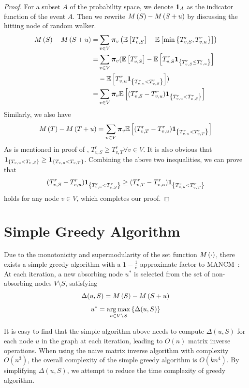 \documentclass[sigconf]{acmart}
\begin{document}
\begin{proof}
    For a subset \(A\) of the probability space, we denote \(\boldsymbol{1}_A\) as the indicator function of the event \(A\). Then we rewrite \(M\left(S\right)-M\left(S+u\right)\) by discussing the hitting node of random walker.
    \begin{align*}
        M\left(S\right)-M\left(S+u\right)
        = & \sum_{v\in V}\boldsymbol{\pi}_v\left( \mathbb{E}\left[T_{v,S}^r\right]-\mathbb{E}\left[\min\left\{T_{v,S}^r,T_{v,u}^r \right\}\right] \right)            \\
        = & \sum_{v\in V}\boldsymbol{\pi}_v(\mathbb{E}\left[T_{v,S}^r\right]-\mathbb{E}\left[T_{v,S}^r\boldsymbol{1}_{\left\{T_{v,S}^r\le T_{v,u}^r \right\}}\right] \\
          & -\mathbb{E}\left[T_{v,u}^r\boldsymbol{1}_{\left\{T_{v,u}^r<T_{v,S}^r \right\}}\right])                                         \\
        = & \sum_{v\in V}\boldsymbol{\pi}_v\mathbb{E}\left[(T_{v,S}^r-T_{v,u}^r)\boldsymbol{1}_{\left\{T_{v,u}^r<T_{v,S}^r \right\}}\right]
    \end{align*}
    Similarly, we also have
    \[M\left(T\right)-M\left(T+u\right)=\sum_{v\in V}\boldsymbol{\pi}_v\mathbb{E}\left[(T_{v,T}^r-T_{v,u}^r)\boldsymbol{1}_{\left\{T_{v,u}^r<T_{v,T}^r \right\}}\right]\]
    As is mentioned in proof of , \(T_{v,S}^r\ge T_{v,T}^r\forall v\in V\).
    It is also obvious that \(\boldsymbol{1}_{\left\{T_{v,u}<T_{v,S} \right\}}\ge\boldsymbol{1}_{\left\{T_{v,u}<T_{v,T} \right\}}\).
    Combining the above two inequalities, we can prove that
    \[(T_{v,S}^r-T_{v,u}^r)\boldsymbol{1}_{\left\{T_{v,u}^r<T_{v,S}^r \right\}}\ge(T_{v,T}^r-T_{v,u}^r)\boldsymbol{1}_{\left\{T_{v,u}^r<T_{v,T}^r \right\}}\]
    holds for any node \(v\in V\), which completes our proof.
\end{proof}

\section{Simple Greedy Algorithm}\label{sec:simple-greedy}

Due to the monotonicity and supermodularity of the set function \(M\left(\cdot\right)\), there exists a simple greedy algorithm with a \(1-\frac1e\) approximate factor to MANCM~\cite{NeWoFi78}:
At each iteration, a new absorbing node \(u^*\) is selected from the set of non-absorbing nodes \(V\setminus S\), satisfying
\[\Delta(u,S)=M\left(S\right)-M\left(S+u\right)\]
\[u^*=\operatorname*{arg\,max}_{u\in V\setminus S}\left\{\Delta(u,S) \right\}\]

It is easy to find that the simple algorithm above needs to compute \(\Delta(u,S)\) for each node \(u\) in the graph at each iteration, leading to \(O(n)\) matrix inverse operations.
When using the naive matrix inverse algorithm with complexity \(O(n^3)\), the overall complexity of the simple greedy algorithm is \(O(kn^4)\).
By simplifying \(\Delta(u,S)\), we attempt to reduce the time complexity of greedy algorithm.
\end{document}

